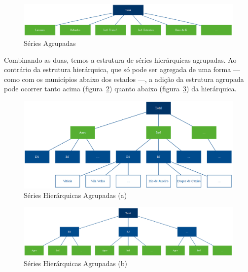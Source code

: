 \documentclass[
  12pt,
  letterpaper,
  DIV=11,
  numbers=noendperiod]{scrartcl}
\begin{document}
\begin{figure}

{\centering \includegraphics{img/agrupadas.png}

}

\caption{\label{fig-a}Séries Agrupadas}

\end{figure}

Combinando as duas, temos a estrutura de séries hierárquicas agrupadas.
Ao contrário da estrutura hierárquica, que só pode ser agregada de uma
forma --- como com os municípios abaixo dos estados ---, a adição da
estrutura agrupada pode ocorrer tanto acima (figura~\ref{fig-ha1})
quanto abaixo (figura~\ref{fig-ha2}) da hierárquica.

\begin{figure}

{\centering \includegraphics{img/hier_agrup.png}

}

\caption{\label{fig-ha1}Séries Hierárquicas Agrupadas (a)}

\end{figure}

\begin{figure}

{\centering \includegraphics{img/hier_agrup_2.png}

}

\caption{\label{fig-ha2}Séries Hierárquicas Agrupadas (b)}

\end{figure}
\end{document}
